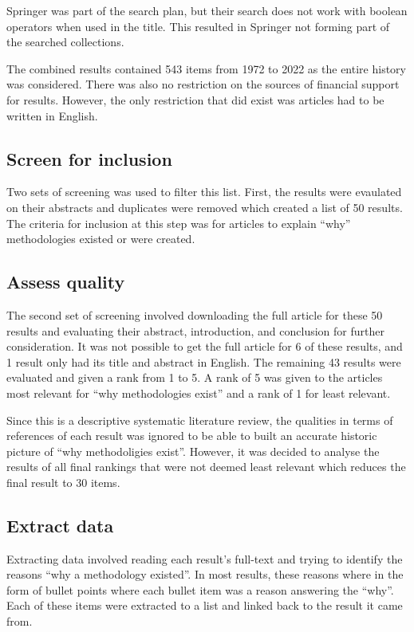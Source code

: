 Springer was part of the search plan, but their search does not work with boolean operators when used in the title.
This resulted in Springer not forming part of the searched collections.

The combined results contained 543  items from 1972 to 2022 as the entire history was considered.
There was also no restriction on the sources of financial support for results.
However, the only restriction that did exist was articles had to be written in English.

\subsection{Screen for inclusion}
Two sets of screening was used to filter this list.
First, the results were evaulated on their abstracts and duplicates were removed which created a list of 50 results.
The criteria for inclusion at this step was for articles to explain ``why'' methodologies existed or were created.

\subsection{Assess quality}
The second set of screening involved downloading the full article for these 50 results and evaluating their abstract, introduction, and conclusion for further consideration.
It was not possible to get the full article for 6 of these results, and 1 result only had its title and abstract in English.
The remaining 43 results were evaluated and given a rank from 1 to 5.
A rank of 5 was given to the articles most relevant for ``why methodologies exist'' and a rank of 1 for least relevant.

Since this is a descriptive systematic literature review, the qualities in terms of references of each result was ignored to be able to built an accurate historic picture of ``why methodoligies exist''.
However, it was decided to analyse the results of all final rankings that were not deemed least relevant which reduces the final result to 30 items.

\subsection{Extract data}
Extracting data involved reading each result's full-text and trying to identify the reasons ``why a methodology existed''.
In most results, these reasons where in the form of bullet points where each bullet item was a reason answering the ``why''.
Each of these items were extracted to a list and linked back to the result it came from.

